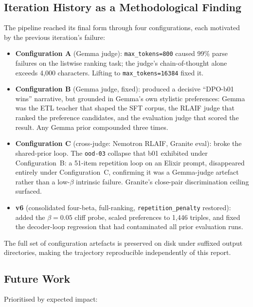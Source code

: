 \documentclass[../main.tex]{subfiles}
\begin{document}
\subsection{Iteration History as a Methodological Finding}
\label{sec:iteration_history}

The pipeline reached its final form through four configurations, each motivated by the previous iteration's failure:

\begin{itemize}
  \item \textbf{Configuration A} (Gemma judge): \texttt{max\_tokens=800} caused 99\% parse failures on the listwise ranking task; the judge's chain-of-thought alone exceeds 4{,}000 characters. Lifting to \texttt{max\_tokens=16384} fixed it.
  \item \textbf{Configuration B} (Gemma judge, fixed): produced a decisive ``DPO-b01 wins'' narrative, but grounded in Gemma's own stylistic preferences: Gemma was the ETL teacher that shaped the SFT corpus, the RLAIF judge that ranked the preference candidates, and the evaluation judge that scored the result. Any Gemma prior compounded three times.
  \item \textbf{Configuration C} (cross-judge: Nemotron RLAIF, Granite eval): broke the shared-prior loop. The \texttt{ood-03} collapse that b01 exhibited under Configuration~B: a 51-item repetition loop on an Elixir prompt, disappeared entirely under Configuration~C, confirming it was a Gemma-judge artefact rather than a low-$\beta$ intrinsic failure. Granite's close-pair discrimination ceiling surfaced.
  \item \textbf{v6} (consolidated four-beta, full-ranking, \texttt{repetition\_penalty} restored): added the $\beta = 0.05$ cliff probe, scaled preferences to 1{,}446 triples, and fixed the decoder-loop regression that had contaminated all prior evaluation runs.
\end{itemize}

The full set of configuration artefacts is preserved on disk under suffixed output directories, making the trajectory reproducible independently of this report.

\subsection{Future Work}
\label{sec:future_work}

Prioritised by expected impact:
\end{document}
